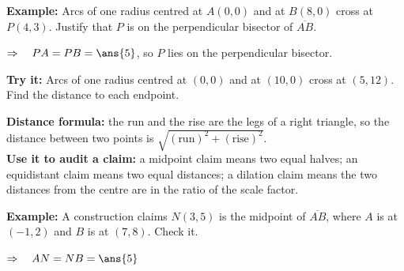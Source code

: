 \documentclass[12pt]{article}
\begin{document}
\begin{examplebox}
\textbf{Example:} \quad Arcs of one radius centred at $A(0, 0)$ and at $B(8, 0)$
cross at $P(4, 3)$. Justify that $P$ is on the perpendicular bisector of
$\overline{AB}$.

$\Rightarrow\quad PA = PB = \ans{5}$, so $P$ lies on the perpendicular bisector.
\end{examplebox}

\begin{tryitbox}
\textbf{Try it:} \quad Arcs of one radius centred at $(0, 0)$ and at $(10, 0)$
cross at $(5, 12)$. Find the distance to each endpoint.\\[2pt]
\end{tryitbox}


\begin{formulabox}
\textbf{Distance formula:} the run and the rise are the legs of a right
triangle, so the distance between two points is $\sqrt{(\text{run})^{2} +
(\text{rise})^{2}}$.\\[3pt]
\textbf{Use it to audit a claim:} a midpoint claim means two equal halves; an
equidistant claim means two equal distances; a dilation claim means the two
distances from the centre are in the ratio of the scale factor.
\end{formulabox}

\begin{examplebox}
\textbf{Example:} \quad A construction claims $N(3, 5)$ is the midpoint of
$\overline{AB}$, where $A$ is at $(-1, 2)$ and $B$ is at $(7, 8)$. Check it.

$\Rightarrow\quad AN = NB = \ans{5}$
\end{examplebox}
\end{document}
